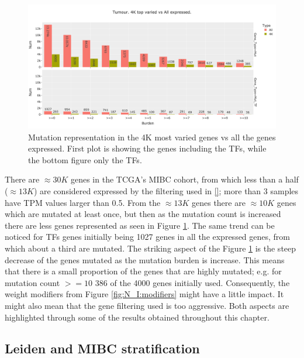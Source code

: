 \begin{figure}[!htb]    \centering\includegraphics[width=1.0\textwidth,height=0.6\textheight,keepaspectratio]{Sections/Network_I/Resources/Tum_network/MutTF_representation_4K-all.png}
    \caption{Mutation representation in the 4K most varied genes vs all the genes expressed. First plot is showing the genes including the TFs, while the bottom figure only the TFs.}
    \label{fig:N_I:mut_rep_tum}
\end{figure}


There are $\approx30K$ genes in the TCGA's MIBC cohort, from which less than a half ($\approx13K$) are considered expressed by the filtering used in \ref{}; more than 3 samples have TPM values larger than 0.5. From the $\approx13K$ genes there are $\approx10K$ genes which are mutated at least once, but then as the mutation count is increased there are less genes represented as seen in Figure \ref{fig:N_I:mut_rep_tum}. The same trend can be noticed for TFs genes initially being 1027 genes in all the expressed genes, from which about a third are mutated. The striking aspect of the Figure \ref{fig:N_I:mut_rep_tum} is the steep decrease of the genes mutated as the mutation burden is increase. This means that there is a small proportion of the genes that are highly mutated; e.g. for mutation count $>=10$ 386 of the 4000 genes initially used. Consequently, the weight modifiers from Figure \ref{fig:N_I:modifiers} might have a little impact. It might also mean that the gene filtering used is too aggressive. Both aspects are highlighted through some of the results obtained throughout this chapter.


\subsection{Leiden and MIBC stratification} \label{s:N_I:tum_stratification}

